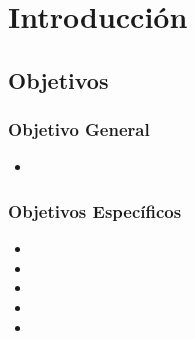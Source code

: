 \section{Introducción}


\subsection{Objetivos}



\subsubsection{Objetivo General}
\begin{itemize}
\item 
\end{itemize}

\subsubsection{Objetivos Específicos}
\begin{itemize}
\item 
\item 
\item 
\item
\item 
\end{itemize}


 


